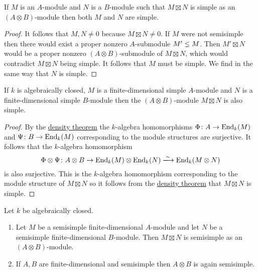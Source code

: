 \begin{lemma}
  \label{lemma: if product is simple then so are factors}
  If $M$ is an $A$-module and $N$ is a $B$-module such that $M \mathbin{\boxtimes} N$ is simple as an $(A \otimes B)$-module then both $M$ and $N$ are simple.
\end{lemma}


\begin{proof}
  It follows that $M, N \neq 0$ because $M \mathbin{\boxtimes} N \neq 0$.
  If $M$ were not semisimple then there would exist a proper nonzero $A$-submodule $M' \lneq M$.
  Then $M' \mathbin{\boxtimes} N$ would be a proper nonzero $(A \otimes B)$-submodule of $M \mathbin{\boxtimes} N$, which would contradict $M \mathbin{\boxtimes} N$ being simple.
  It follows that $M$ must be simple.
  We find in the same way that $N$ is simple.
\end{proof}


\begin{lemma}
  \label{lemma: tensor product of modules is again simple}
  If $k$ is algebraically closed, $M$ is a finite-dimensional simple $A$-module and $N$ is a finite-dimensional simple $B$-module then the $(A \otimes B)$-module $M \mathbin{\boxtimes} N$ is also simple.
\end{lemma}


\begin{proof}
  By the \hyperref[theorem: density theorem]{density theorem} the $k$-algebra homomorphisms $\Phi \colon A \to \operatorname{End}_k(M)$ and $\Psi \colon B \to \operatorname{End}_k(M)$ corresponding to the module structures are surjective.
  It follows that the $k$-algebra homomorphism
  \[
                            \Phi \otimes \Psi
    \colon                  A \otimes B
    \to                     \End_k(M) \otimes \End_k(N)
    \xlongrightarrow{\sim}  \End_k(M \otimes N)
  \]
  is also surjective.
  This is the $k$-algebra homomorphism corresponding to the module structure of $M \mathbin{\boxtimes} N$ so it follows from the \hyperref[theorem: density theorem]{density theorem} that $M \mathbin{\boxtimes} N$ is simple.
\end{proof}




\begin{corollary}
  Let $k$ be algebraically closed.
  \begin{enumerate}
    \item
      \label{enumerate: outer tensor product of semisimple modules}
      Let $M$ be a semisimple finite-dimensional $A$-module and let $N$ be a semisimple finite-dimensional $B$-module.
      Then $M \mathbin{\boxtimes} N$ is semisimple as an $(A \otimes B)$-module.
    \item
      If $A, B$ are finite-dimensional and semisimple then $A \otimes B$ is again semisimple.
  \end{enumerate}
\end{corollary}


